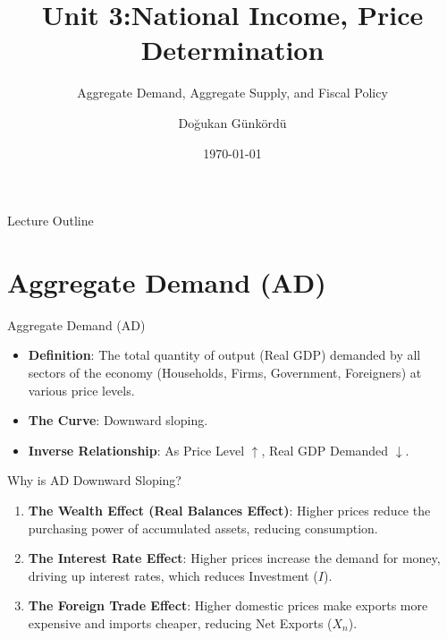 \documentclass{beamer}
\title{Unit 3:National Income, Price Determination}
\subtitle{Aggregate Demand, Aggregate Supply, and Fiscal Policy}
\author{Doğukan Günkördü}
\date{\today}
\begin{document}
\begin{frame}
    \titlepage
\end{frame}

\begin{frame}{Lecture Outline}
    \tableofcontents
\end{frame}

\section{Aggregate Demand (AD)}

\begin{frame}{Aggregate Demand (AD)}
    \begin{itemize}
        \item \textbf{Definition}: The total quantity of output (Real GDP) demanded by all sectors of the economy (Households, Firms, Government, Foreigners) at various price levels.
        \item \textbf{The Curve}: Downward sloping.
        \item \textbf{Inverse Relationship}: As Price Level $\uparrow$, Real GDP Demanded $\downarrow$.
    \end{itemize}
    \vspace{0.5cm}
    \begin{block}{Why is AD Downward Sloping?}
        \begin{enumerate}
            \item \textbf{The Wealth Effect (Real Balances Effect)}: Higher prices reduce the purchasing power of accumulated assets, reducing consumption.
            \item \textbf{The Interest Rate Effect}: Higher prices increase the demand for money, driving up interest rates, which reduces Investment ($I$).
            \item \textbf{The Foreign Trade Effect}: Higher domestic prices make exports more expensive and imports cheaper, reducing Net Exports ($X_n$).
        \end{enumerate}
    \end{block}
\end{frame}
\end{document}
